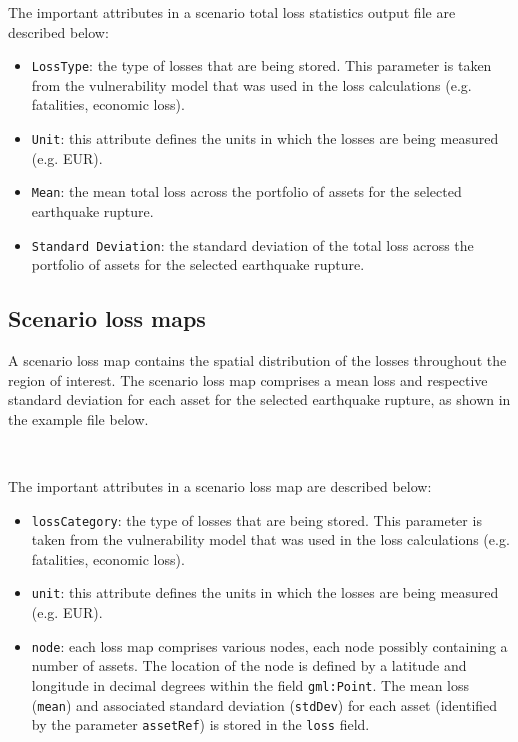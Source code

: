The important attributes in a scenario total loss statistics output file are
described below:


\begin{itemize}

  \item \Verb+LossType+: the type of losses that are being stored. This
    parameter is taken from the \gls{vulnerability model} that was used in the
    loss calculations (e.g. fatalities, economic loss).

  \item \Verb+Unit+: this attribute defines the units in which the losses are
    being measured (e.g. EUR).

  \item \Verb+Mean+: the mean total loss across the portfolio of assets for the
    selected earthquake rupture.

  \item \Verb+Standard Deviation+: the standard deviation of the total loss 
    across the portfolio of assets for the selected earthquake rupture.

\end{itemize}


\subsection{Scenario loss maps}
\label{subsec:scenario_loss_map}

A scenario loss map contains the spatial distribution of the losses throughout
the region of interest. The scenario loss map comprises a mean loss and
respective standard deviation for each \gls{asset} for the selected earthquake
rupture, as shown in the example file below.

\inputminted[firstline=1,firstnumber=1,fontsize=\footnotesize,frame=single,bgcolor=lightgray]{xml}{oqum/risk/verbatim/output_scenario_loss_map.xml}\\

The important attributes in a scenario loss map are described below:

\begin{itemize}

  \item \Verb+lossCategory+: the type of losses that are being stored. This
    parameter is taken from the \gls{vulnerability model} that was used in the
    loss calculations (e.g. fatalities, economic loss).

  \item \Verb+unit+: this attribute defines the units in which the losses are
    being measured (e.g. EUR).

  \item \Verb+node+: each loss map comprises various nodes, each node possibly
    containing a number of \glspl{asset}. The location of the node is defined
    by a latitude and longitude in decimal degrees within the field
    \Verb+gml:Point+. The mean loss (\Verb+mean+) and associated standard
    deviation (\Verb+stdDev+) for each \gls{asset} (identified by the parameter
    \Verb+assetRef+) is stored in the \Verb+loss+ field.

\end{itemize}